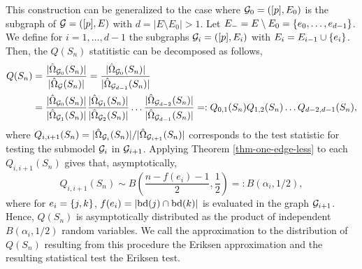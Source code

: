This construction can be generalized to the case where ${\mathcal{G}}_0 = ([p], E_0)$ is the subgraph of ${\mathcal{G}} = ([p], E)$ with $d = |E \setminus E_0| > 1$. Let $E_- = E \setminus E_0 = {\left\{e_0, \ldots, e_{d-1}\right\}}$. We define for $i = 1, \ldots, d-1$ the subgraphs ${\mathcal{G}}_i = ([p], E_i)$ with $E_i = E_{i-1} \cup {\left\{e_i\right\}}$. Then, the $Q(S_n)$ statitistic can be decomposed as follows,
\begin{align*}
    Q(S_n) 
    &= \frac{|\hat\Omega_{{\mathcal{G}}_0}(S_n)|}{|\hat\Omega_{{\mathcal{G}}}(S_n)|}
    = \frac{|\hat\Omega_{{\mathcal{G}}_0}(S_n)|}{|\hat\Omega_{{\mathcal{G}}_{d-1}}(S_n)|} \\
    &= \frac{|\hat\Omega_{{\mathcal{G}}_0}(S_n)|}{|\hat\Omega_{{\mathcal{G}}_1}(S_n)|}
    \frac{|\hat\Omega_{{\mathcal{G}}_1}(S_n)|}{|\hat\Omega_{{\mathcal{G}}_2}(S_n)|}
    \ldots
    \frac{|\hat\Omega_{{\mathcal{G}}_{d-2}}(S_n)|}{|\hat\Omega_{{\mathcal{G}}_{d-1}}(S_n)|}
    =: Q_{0,1}(S_n)Q_{1,2}(S_n) \ldots Q_{d-2, d-1}(S_n),
\end{align*}
where $Q_{i, i+1}(S_n) = |\hat\Omega_{{\mathcal{G}}_i}(S_n)| / |\hat\Omega_{{\mathcal{G}}_{i+1}}(S_n)|$ corresponds to the test statistic for testing the submodel ${\mathcal{G}}_i$ in ${\mathcal{G}}_{i+1}$. Applying Theorem \ref{thm-one-edge-less} to each $Q_{i, i+1}(S_n)$ gives that, asymptotically,
\begin{equation*}
    Q_{i, i+1}(S_n) \sim B\left(\frac{n - f(e_i) - 1}{2}, \frac{1}{2} \right) =: B(\alpha_i, 1/2),
\end{equation*}
where for $e_i = {\left\{j, k\right\}}$, $f(e_i) = |{\textrm{bd}}(j) \cap {\textrm{bd}}(k)|$ is evaluated in the graph ${\mathcal{G}}_{i+1}$. Hence, $Q(S_n)$ is asymptotically distributed as the product of independent $B(\alpha_i, 1/2)$ random variables. We call the approximation to the distribution of $Q(S_n)$ resulting from this procedure the Eriksen approximation and the resulting statistical test the Eriksen test.
